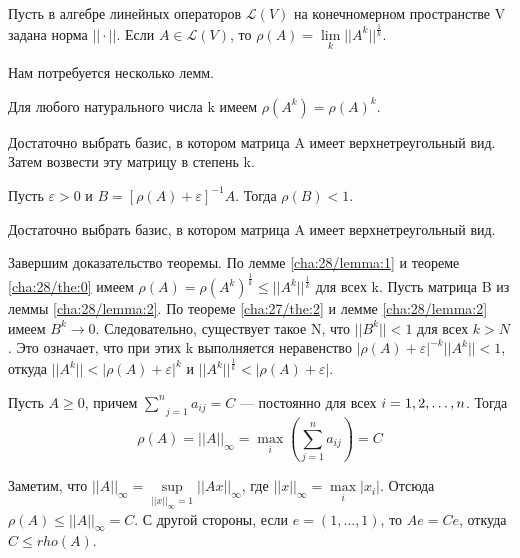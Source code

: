 \begin{theorem}[]\label{cha:28/the:1}
	Пусть в алгебре линейных операторов $\mathcal{L}(V)$ на конечномерном пространстве V задана норма $||\cdot||$. Если $A \in \mathcal{L}(V)$, то $\rho(A) = \underset{k}{\lim}||A^k||^{\frac{1}{k}}$.
\end{theorem}
\begin{Proof}
	Нам потребуется несколько лемм.

	\begin{lemma}\label{cha:28/lemma:1}
		Для любого натурального числа k имеем $\rho(A^k) = \rho(A)^k$.
	\end{lemma}
	\begin{Proof}
		Достаточно выбрать базис, в котором матрица A имеет верхнетреугольный вид. Затем возвести эту матрицу в степень k.
	\end{Proof}

	\begin{lemma}\label{cha:28/lemma:2}
		Пусть $\varepsilon > 0$ и $B = [\rho(A) + \varepsilon]^{−1}A$. Тогда $\rho(B) < 1$.
	\end{lemma}
	\begin{Proof}
		Достаточно выбрать базис, в котором матрица A имеет верхнетреугольный вид.
	\end{Proof}

	Завершим доказательство теоремы. По лемме \ref{cha:28/lemma:1} и теореме \ref{cha:28/the:0} имеем $\rho(A) = \rho(A^k)^{\frac{1}{k}} \le ||A^k||^{\frac{1}{k}}$ для всех k. Пусть матрица B из леммы \ref{cha:28/lemma:2}. По теореме \ref{cha:27/the:2} и лемме \ref{cha:28/lemma:2} имеем $B^k \to 0$. Следовательно, существует такое N, что $||B^k|| < 1$ для всех $k > N$. Это означает, что при этих k выполняется неравенство $|\rho(A) + \varepsilon|^{−k}||A^k|| < 1$, откуда $||A^k|| < |\rho(A) + \varepsilon|^k$ и $||A^k||^{\frac{1}{k}} < |\rho(A) + \varepsilon|$.
\end{Proof}

\begin{propose}\label{cha:29/propose:3}
	Пусть $A \ge 0$, причем $\underset{j=1}{\overset{n}{\sum}}a_{ij} = C$ — постоянно для всех $i = 1,2,\dots,n$. Тогда
	$$\rho(A) = ||A||_{\infty} = \underset{i}{\max}\left( \underset{j=1}{\overset{n}{\sum}}a_{ij} \right) = C$$
\end{propose}
\begin{Proof}
	Заметим, что $||A||_{\infty} = \underset{||x||_{\infty}=1}{\sup} ||Ax||_{\infty}$, где $||x||_{\infty} = \underset{i}{\max}|x_i|$. Отсюда $\rho(A) \le ||A||_{\infty} = C$. С другой стороны, если $e = (1, \dots, 1)$, то $Ae = Ce$, откуда $C \le rho(A)$.
\end{Proof}

